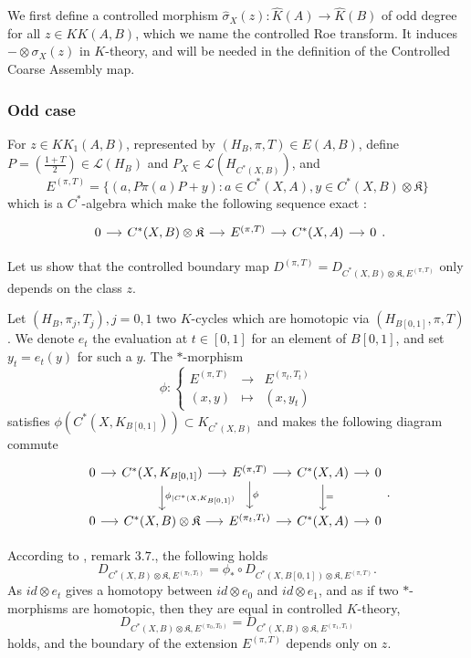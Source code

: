 We first define a controlled morphism $\hat \sigma_X(z) : \hat K(A)\rightarrow \hat K(B)$ of odd degree for all $z\in KK(A,B)$, which we name the controlled Roe transform. It induces $-\otimes \sigma_X(z)$ in $K$-theory, and will be needed in the definition of the Controlled Coarse Assembly map.

\subsubsection{Odd case}

For $z\in KK_1(A,B)$, represented by $(H_B,\pi,T)\in E(A,B)$, define $P=(\frac{1+T}{2})\in \mathcal L(H_B)$ and $P_X\in\mathcal L(H_{C^*(X,B)})$, and  
\[E^{(\pi,T)} = \{(a,P\pi(a)P + y) : a\in C^*(X,A),y\in C^*(X,B)\otimes \mathfrak K\} \]
which is a $C^*$-algebra which make the following sequence exact :
\[\begin{tikzcd}[column sep = small]0\arrow{r} & C^*(X,B)\otimes \mathfrak K \arrow{r} & E^{(\pi,T)}\arrow{r} & C^*(X,A)\arrow{r} & 0 \end{tikzcd}.\]

Let us show that the controlled boundary map $D^{(\pi,T)}=D_{C^*(X,B)\otimes \mathfrak K,E^{(\pi,T)}}$ only depends on the class $z$.

Let $(H_B, \pi_j,T_j), j=0,1$ two $K$-cycles which are homotopic via $(H_{B[0,1]},\pi,T)$. We denote $e_t$ the evaluation at $t\in[0,1]$ for an element of $B[0,1]$, and set $y_t=e_t(y)$ for such a $y$. The $*$-morphism
\[\phi : \left\{\begin{array}{lll}E^{(\pi,T)} & \rightarrow & E^{(\pi_t,T_t)} \\ (x,y) & \mapsto & (x, y_t)\end{array}\right.\]
satisfies $\phi(C^*(X,K_{B[0,1]}))\subset K_{C^*(X,B)}$ and makes the following diagram commute
\[\begin{tikzcd}[column sep = small]
0\arrow{r} & C^*(X,K_{B[0,1]})\arrow{r}\arrow{d}{\phi_{|C^*(X,K_{B[0,1]})}} & E^{(\pi,T)} \arrow{r}\arrow{d}{\phi} & C^*(X,A)\arrow{r}\arrow{d}{=}& 0 \\
0\arrow{r} & C^*(X,B)\otimes\mathfrak K\arrow{r} &  E^{(\pi_t,T_t)} \arrow{r} & C^*(X,A) \arrow{r} & 0
\end{tikzcd}.\]

According to \cite{OY2}, remark $3.7.$, the following holds
\[D_{C^*(X,B)\otimes\mathfrak K,E^{(\pi_t,T_t)}} = \phi_* \circ D_{C^*(X,B[0,1])\otimes\mathfrak K,E^{(\pi,T)}}.\]
As $id \otimes e_t$ gives a homotopy between $id\otimes e_0$ and $id\otimes e_1$, and as if two $*$-morphisms are homotopic, then they are equal in controlled $K$-theory, 
\[D_{C^*(X,B)\otimes\mathfrak K, E^{(\pi_0,T_0)}}=D_{C^*(X,B)\otimes\mathfrak K, E^{(\pi_1,T_1)}}\]
holds, and the boundary of the extension $E^{(\pi,T)}$ depends only on $z$.\\

